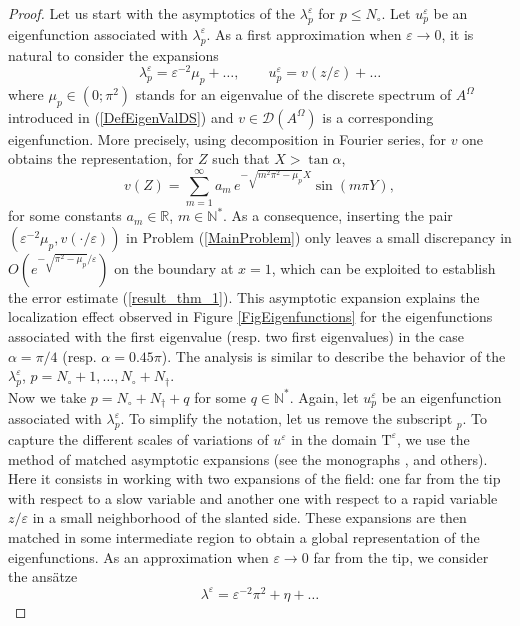 \documentclass[11pt,a4paper]{article}
\newcommand{\eps}{\varepsilon}
\newcommand{\Om}{\Omega}
\newcommand{\N}{\mathbb{N}}
\newcommand{\R}{\mathbb{R}}
\begin{document}
\begin{proof}
Let us start with the asymptotics of the $\lambda^\eps_p$ for $p\le N_\circ$. Let $u^\eps_p$ be an eigenfunction associated with $\lambda^\eps_p$. As a first approximation when $\eps\to0$, it is natural to consider the expansions
\begin{equation}\label{DefAn}
\lambda^\eps_p=\eps^{-2}\mu_p+\dots,\qquad u^\eps_p=v(z/\eps)+\dots
\end{equation}
where $\mu_p\in(0;\pi^2)$ stands for an eigenvalue of the discrete spectrum of $A^{\Om}$ introduced in (\ref{DefEigenValDS}) and $v\in \mathcal{D}(A^\Om)$ is a corresponding eigenfunction. More precisely, using decomposition in Fourier series, for $v$ one obtains the representation, for $Z$ such that $X>\tan\alpha$,
\[
v(Z)=\sum_{m=1}^\infty a_m\,e^{-\sqrt{m^2\pi^2-\mu_p}X}\sin(m\pi Y),
\]
for some constants $a_m\in\R$, $m\in\N^\ast$. As a consequence, inserting the pair $(\eps^{-2}\mu_p,v(\cdot/\eps))$ in Problem (\ref{MainProblem}) only leaves a small discrepancy in $O(e^{-\sqrt{\pi^2-\mu_p}/\eps})$ on the boundary at $x=1$, which can be exploited to establish the error estimate (\ref{result_thm_1}). 
This asymptotic expansion explains the localization effect observed in Figure \ref{FigEigenfunctions} for the eigenfunctions associated with the first eigenvalue (resp. two first eigenvalues) in the case $\alpha=\pi/4$ (resp. $\alpha=0.45\pi$). The analysis is similar to describe the behavior of the $\lambda^\eps_p$, $p=N_\circ+1,\dots,N_\circ+N_\dagger$. \\
\newline
Now we take $p=N_\circ+N_\dagger+q$ for some $q\in\N^{\ast}$. Again, let $u^\eps_p$ be an eigenfunction associated with $\lambda^\eps_p$. To simplify the notation, let us remove the subscript ${}_p$. To capture the different scales of variations of $u^\eps$ in the domain $\mathrm{T}^\eps$, we use the method of matched asymptotic expansions (see the monographs \cite{VD,Ilin}, \cite[Chap.\,2]{MaNaPl} and others). Here it consists in working with two expansions of the field: one far from the tip with respect to a slow variable and another one with respect to a rapid variable $z/\eps$ in a small neighborhood of the slanted side. These expansions are then matched in some intermediate region to obtain a global representation of the eigenfunctions. As an approximation when $\eps\to0$ far from the tip, we consider the ans\"atze 
\begin{equation}\label{ansatzvp}
\lambda^\eps=\eps^{-2}\pi^2+\eta+\dots
\end{equation}

\end{proof}
\end{document}
